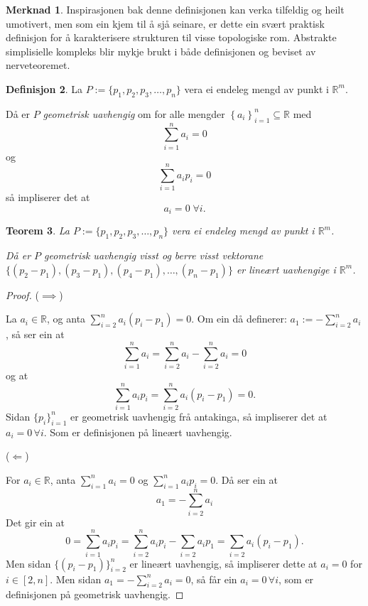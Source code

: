 \documentclass[a4paper, 12pt, norsk]{article}
\theoremstyle{plain}
\newtheorem{theorem}{Teorem}[section]
\theoremstyle{definition}
\newtheorem{definition}[theorem]{Definisjon}
\newtheorem{remark}[theorem]{Merknad}
\newcommand{\Rb}{\mathbb{R}}
\newcommand{\set}[1]{ \left\{ #1 \right\} } %
\begin{document}
\begin{remark}
	Inspirasjonen bak denne definisjonen kan verka tilfeldig og heilt umotivert, men som ein kjem til å sjå seinare, er dette ein svært praktisk definisjon for å karakterisere strukturen til visse topologiske rom. Abstrakte simplisielle kompleks blir mykje brukt i både definisjonen og beviset av nerveteoremet.
\end{remark}

\begin{definition}
	La $ P := \{p_1, p_2, p_3, \dots, p_n\}$ vera ei endeleg mengd av punkt i $\Rb^m$.

	Då er \( P \) \emph{geometrisk uavhengig} om for alle mengder \( \set{a_i}_{i=1}^n\subseteq\Rb \) med
	\[
		\sum_{i=1}^n a_i=0  
	\]
	og
	\[
		\sum_{i=1}^n a_ip_i=0
	\]
	så impliserer det at
	\[
		a_i=0 \; \forall i.
	\]
\end{definition}

\begin{theorem}\label{thm:geometrisklineærtuavhengig}
	La $ P := \{p_1, p_2, p_3, \dots, p_n \}$ vera ei endeleg mengd av punkt i \( \Rb^m \).

	Då er \( P \) geometrisk uavhengig visst og berre visst vektorane $\{(p_2-p_1), (p_3-p_1), (p_4-p_1),\dots,(p_n-p_1)\}$ er lineært uavhengige i \( \Rb^m \).
\end{theorem}

\begin{proof}
	($\implies$)
		
	La $a_i\in\Rb$, og anta $\sum_{i=2}^na_i(p_i-p_1)=0$. Om ein då definerer: $a_1 := -\sum_{i=2}^na_i$, så ser ein at 
	\begin{equation*}
		\sum_{i=1}^na_i=\sum_{i=2}^na_i-\sum_{i=2}^na_i=0
	\end{equation*}
	og at 
	\begin{equation*}
		\sum_{i=1}^na_ip_i=\sum_{i=2}^na_i(p_i-p_1)=0.
	\end{equation*}
	Sidan $\{p_i\}_{i=1}^n$ er geometrisk uavhengig frå antakinga, så impliserer det at $a_i=0 \, \forall i$. Som er definisjonen på lineært uavhengig.
	
	(\(\Longleftarrow\))
	
	For $a_i\in\Rb$, anta $\sum_{i=1}^n a_i=0$ og $\sum_{i=1}^n a_ip_i=0$. Då ser ein at 
	\begin{equation*}
		a_1=-\sum_{i=2}^n a_i
	\end{equation*} 
	Det gir ein at
	\begin{equation*}
		0=\sum_{i=1}^n a_ip_i=\sum_{i=2}^n a_ip_i-\sum_{i=2}a_ip_1=\sum_{i=2}a_i(p_i-p_1).
	\end{equation*}
	Men sidan $\{(p_i-p_1)\}_{i=2}^n$ er lineært uavhengig, så impliserer dette at $ a_i = 0$ for $i\in[2,n]$. Men sidan $a_1 = -\sum_{i=2}^n a_i=0$, så får ein $a_i=0 \, \forall i$, som er definisjonen på geometrisk uavhengig.
\end{proof}
\end{document}
